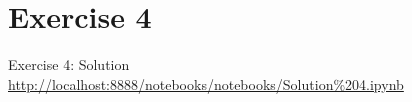 \section{Exercise 4}

\begin{frame}{Exercise 4: Solution}
    \centering
    \vfill
    \scriptsize{\url{http://localhost:8888/notebooks/notebooks/Solution\%204.ipynb}}
    \vfill
\end{frame}
